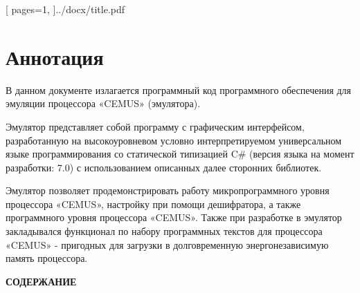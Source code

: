 \documentclass[12pt,a4paper]{article}
\makeatletter
\newcommand{\sectionsize}{\fontsize{14pt}{14pt}}
\renewcommand\tableofcontents{%
    \centerline{\textbf{СОДЕРЖАНИЕ}}\vspace{-1cm}

    \null\hfill\textbf{\sectionsize}\hfill\null\par
    \@mkboth{\MakeUppercase\contentsname}{\MakeUppercase\contentsname}%
    \@starttoc{toc}%
}
\makeatother
\begin{document}

[
    pages={1}, 
]{../docx/title.pdf}


\section*{Аннотация}

В данном документе излагается программный код программного обеспечения для эмуляции процессора «CEMUS» (эмулятора). 

Эмулятор представляет собой программу с графическим интерфейсом, разработанную на высокоуровневом условно интерпретируемом универсальном языке программирования со статической типизацией C\# (версия языка на момент разработки: 7.0) с использованием описанных далее сторонних библиотек.

Эмулятор позволяет продемонстрировать работу микропрограммного уровня процессора «CEMUS», настройку при помощи дешифратора, а также программного уровня процессора «CEMUS». Также при разработке в эмулятор закладывался функционал по набору программных текстов для процессора «CEMUS» - пригодных для загрузки в долговременную энергонезависимую память процессора. 

\newpage

\tableofcontents

\newpage
\end{document}
